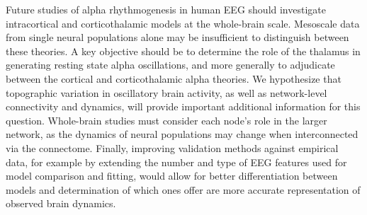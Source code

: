 \documentclass[12pt,twoside]{article}
\begin{document}
Future studies of alpha rhythmogenesis in human EEG should investigate intracortical and corticothalamic models at the whole-brain scale. Mesoscale data from single neural populations alone may be insufficient to distinguish between these theories. A key objective should be to determine the role of the thalamus in generating resting state alpha oscillations, and more generally to adjudicate between the cortical and corticothalamic alpha theories. We hypothesize that topographic variation in oscillatory brain activity, as well as network-level connectivity and dynamics, will provide important additional information for this question. Whole-brain studies must consider each node's role in the larger network, as the dynamics of neural populations may change when interconnected via the connectome. Finally, improving validation methods against empirical data, for example by extending the number and type of EEG features used for model comparison and fitting, would allow for better differentiation between models and determination of which ones offer are more accurate representation of observed brain dynamics.




\end{document}
